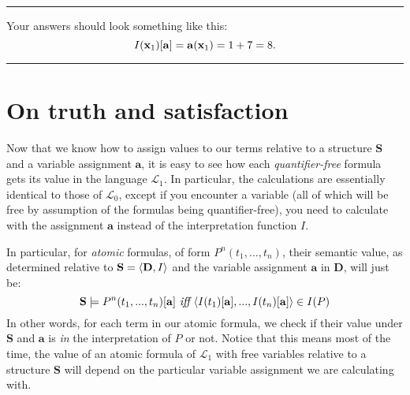\hrule\medskip

\begin{remark}
Your answers should look something like this: 
\[
I(\mathbf{x}_{1})[\mathbf{a}]=\mathbf{a}(\mathbf{x}_{1})=1+7=8.
\]
\end{remark}

\hrule\medskip


\section{On truth and satisfaction}

Now that we know how to assign values to our terms relative to a structure $\mathbf{S}$ and a variable assignment $\mathbf{a}$, it is easy to see how each \textit{quantifier-free} formula gets its value in the language $\mathcal{L}_1$. In particular, the calculations are essentially identical to those of $\mathcal{L}_0$, except if you encounter a variable (all of which will be free by assumption of the formulas being quantifier-free), you need to calculate with the assignment $\mathbf{a}$ instead of the interpretation function $I$. 

In particular, for \textit{atomic} formulas, of form $P^n(t_1, ..., t_n)$, their semantic value, as determined relative to $\mathbf{S}=\langle\mathbf{D}, I\rangle$ and the variable assignment $\mathbf{a}$ in $\mathbf{D}$, will just be:
\[
\mathbf{S}\models P^n(t_1, ..., t_n)[\mathbf{a}] \textit{ iff } \langle I(t_1)[\mathbf{a}], ..., I(t_n)[\mathbf{a}]\rangle \in I(P)
\]
In other words, for each term in our atomic formula, we check if their value under $\mathbf{S}$ and $\mathbf{a}$ is \textit{in} the interpretation of $P$ or not. Notice that this means most of the time, the value of an atomic formula of $\mathcal{L}_1$ with free variables relative to a structure $\mathbf{S}$ will depend on the particular variable assignment we are calculating with. 


